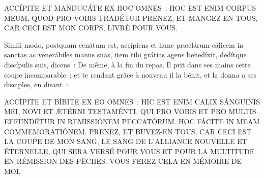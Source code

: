 \begin{paracol}{2}
\LigneParacol{0cm}
{ACCÍPITE ET MANDUCÁTE EX HOC OMNES~: HOC EST ENIM CORPUS MEUM, QUOD PRO VOBIS TRADÉTUR}
{PRENEZ, ET MANGEZ-EN TOUS, CAR CECI EST MON CORPS, LIVRÉ POUR VOUS.}

\LigneParacol{0cm}
{Símili modo, postquam cenátum est, accípiens et hunc præclárum cálicem in sanctas ac venerábiles manus suas, item tibi grátias agens benedíxit, dedítque discípulis suis, dicens~:}
{De même, à la fin du repas, Il prit dans ses mains cette coupe incomparable~; et te rendant grâce à nouveau il la bénit, et la donna a ses disciples, en disant~:}

\LigneParacol{0cm}
{ACCÍPITE ET BÍBITE EX EO OMNES~: HIC EST ENIM CALIX SÁNGUINIS MEI, NOVI ET ÆTÉRNI TESTAMÉNTI, QUI PRO VOBIS ET PRO MULTIS EFFUNDÉTUR IN REMISSIÓNEM PECCATÓRUM. HOC FÁCITE IN MEAM COMMEMORATIÓNEM.}
{PRENEZ, ET BUVEZ-EN TOUS, CAR CECI EST LA COUPE DE MON SANG, LE SANG DE L'ALLIANCE NOUVELLE ET ÉTERNELLE, QUI SERA VERSÉ POUR VOUS ET POUR LA MULTITUDE EN RÉMISSION DES PÊCHES. VOUS FEREZ CELA EN MÉMOIRE DE MOI.}

\end{paracol}



